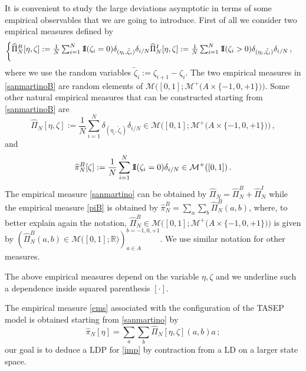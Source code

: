 \documentclass[reqno]{amsart}
\theoremstyle{plain}
\theoremstyle{definition}
\theoremstyle{remark}
\numberwithin{equation}{section}
\numberwithin{theorem}{section}
\def\\{\par\medskip}
\newcommand{\id}{{1 \mskip -5mu {\rm I}}}
\renewcommand{\hat}{\widehat}
\newcommand{\<}{\langle}
\renewcommand{\>}{\rangle}
\begin{document}
	It is convenient to study the large deviations asymptotic in terms of some empirical observables that we are going to introduce. First of all we consider two empirical measures defined by
	\begin{equation}\label{sanmartinoB}
		\begin{cases}
			\hat{\Pi}^B_N[\eta,\zeta]:=\frac{1}{N}\sum_{i=1}^N\id(\zeta_i=0)\delta_{(\eta_i,\tilde\zeta_i)}\delta_{i/N}\\
			\hat{\Pi}^I_N[\eta,\zeta]:=\frac{1}{N}\sum_{i=1}^N\id(\zeta_i>0)\delta_{(\eta_i,\tilde\zeta_i)}\delta_{i/N}\,,
		\end{cases}
	\end{equation}
	where we use the random variables $\tilde\zeta_i:=\zeta_{i+1}-\zeta_i$. The two empirical measures in \eqref{sanmartinoB} are random elements of
	$\mathcal M\Big([0,1]; \mathcal M^+\big(A\times\{-1,0,+1\}\big)\Big)$. Some other natural empirical measures that can be constructed starting from \eqref{sanmartinoB} are
	\begin{equation}\label{sanmartino}
		\hat{\Pi}_N[\eta,\zeta]:=\frac{1}{N}\sum_{i=1}^N\delta_{(\eta_i,\tilde\zeta_i)}\delta_{i/N}\in \mathcal M\Big([0,1]; \mathcal M^+\big(A\times\{-1,0,+1\}\big)\Big)\,,
	\end{equation}
	and 
	\begin{equation}\label{piB}
		\hat{\pi}^B_N[\zeta]:=\frac{1}{N}\sum_{i=1}^N\id(\zeta_i=0)\delta_{i/N}\in \mathcal M^+([0,1])\,.
	\end{equation} 
	The empirical measure \eqref{sanmartino} can be obtained by
	$\hat{\Pi}_N=\hat{\Pi}_N^B+\hat{\Pi}_N^I$ while the empirical measure \eqref{piB} is obtained by
	$\hat{\pi}^B_N=\sum_{a}\sum_{b}\hat{\Pi}^B_N\left(a, b\right)$, where, to better explain again the notation, $\hat{\Pi}^B_N \in \mathcal M\Big([0,1]; \mathcal M^+\big(A\times\{-1,0,+1\}\big)\Big)$ is given by $\left(\hat{\Pi}^B_N\left(a,b\right)\in \mathcal M\Big([0,1]; \mathbb R\Big)\right)_{a\in A}^{ b=-1,0,+1}$. We use similar notation for other measures.
	
	The above empirical measures depend on the variable $\eta,\zeta$ and we underline such a dependence inside squared parenthesis $[\cdot ]$. 
	
	The empirical measure \eqref{ems} associated with the configuration of the TASEP model is obtained starting from \eqref{sanmartino} by
	\begin{equation}\label{imp}
		\hat \pi_N[\eta]=\sum_{a}\sum_{ b}\hat \Pi_N[\eta,\zeta]\left(a, b\right)a\,;
	\end{equation}
	our goal is to deduce a LDP for \eqref{imp}
	by contraction from a LD on a larger state space. 
	
\end{document}

